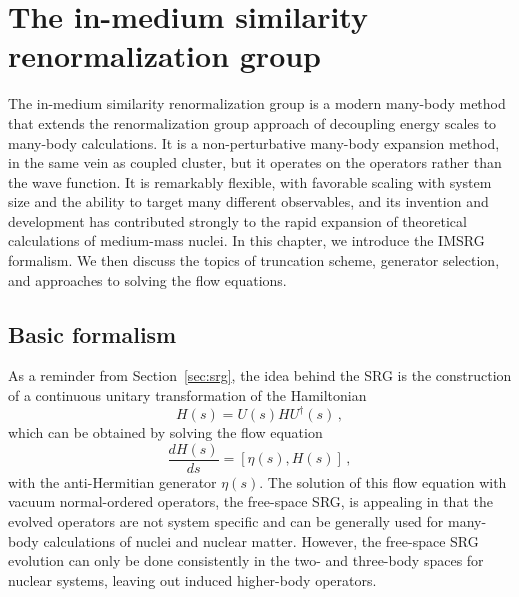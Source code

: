 \chapter{The in-medium similarity renormalization group}\label{ch:imsrg}

The in-medium similarity renormalization group
is a modern \abinitio{} many-body method
that extends the renormalization group approach of decoupling energy scales
to many-body calculations.
It is a non-perturbative many-body expansion method,
in the same vein as coupled cluster,
but it operates on the operators rather than the wave function.
It is remarkably flexible,
with favorable scaling with system size
and the ability to target many different observables,
and its invention and development has contributed strongly
to the rapid expansion of \abinitio{} theoretical calculations of medium-mass nuclei.
In this chapter, we introduce the IMSRG formalism.
We then discuss the topics of truncation scheme, generator selection,
and approaches to solving the flow equations.

\section{Basic formalism}

As a reminder from Section~\ref{sec:srg},
the idea behind the SRG is
the construction of a continuous unitary transformation of the Hamiltonian
\begin{equation}
  H(s) = U(s) H U^{\dagger}(s)\,,
\end{equation}
which can be obtained by solving the flow equation
\begin{equation}\label{eq:srg_flow_equation_imsrg}
  \frac{d H(s)}{ds} = [\eta(s), H(s)]\,,
\end{equation}
with the anti-Hermitian generator $\eta(s)$.
The solution of this flow equation with vacuum normal-ordered operators,
the free-space SRG,
is appealing in that the evolved operators are not system specific
and can be generally used for many-body calculations of nuclei and nuclear matter.
However, the free-space SRG evolution can only be done consistently
in the two- and three-body spaces for nuclear systems,
leaving out induced higher-body operators.

